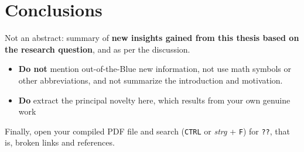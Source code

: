 \chapter{Conclusions}
\label{ch:conclusion}

Not an abstract: summary of \textbf{new insights gained from this thesis based on the research question}, and as per the discussion.\vspace{1em}

\begin{itemize}
	\item \textbf{Do not} mention out-of-the-Blue new information, not use math symbols or other abbreviations, and not summarize the introduction and motivation.
	\item \textbf{Do} extract the principal novelty here, which results from your own genuine work
\end{itemize}

Finally, open your compiled PDF file and search  (\texttt{CTRL} or \textit{strg} + \texttt{F}) for \texttt{??}, that is, broken links and references.